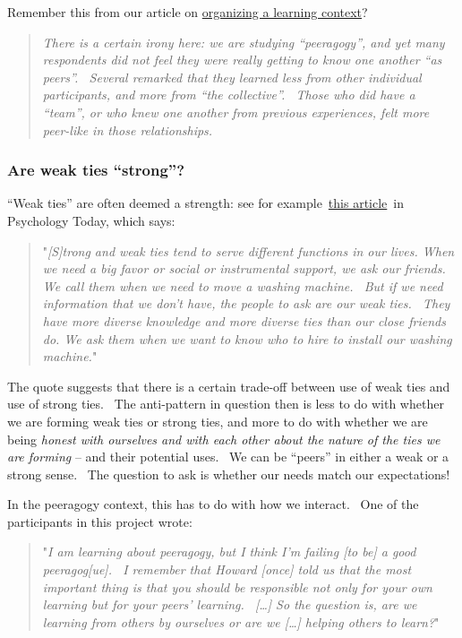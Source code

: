 Remember this from our article on
\href{http://peeragogy.org/organizing-a-learning-context/}{organizing a
learning context}?

\begin{quote}
\emph{There is a certain irony here: we are studying ``peeragogy'', and
yet many respondents did not feel they were really getting to know one
another ``as peers''.~ Several remarked that they learned less from
other individual participants, and more from ``the collective''.~ Those
who did have a ``team'', or who knew one another from previous
experiences, felt more peer-like in those relationships.}
\end{quote}

\subsubsection{Are weak ties ``strong''?}

``Weak ties'' are often deemed a strength: see for
example~\href{http://www.psychologytoday.com/blog/thinking-about-kids/201005/facebook-and-the-strength-weak-ties}{this
article}~in Psychology Today, which says:

\begin{quote}
"\emph{{[}S{]}trong and weak ties tend to serve different functions in
our lives. When we need a big favor or social or instrumental support,
we ask our friends.~ We call them when we need to move a washing
machine.~ But if we need information that we don't have, the people to
ask are our weak ties.~ They have more diverse knowledge and more
diverse ties than our close friends do. We ask them when we want to know
who to hire to install our washing machine.}"
\end{quote}

The quote suggests that there is a certain trade-off between use of weak
ties and use of strong ties.~ The anti-pattern in question then is less
to do with whether we are forming weak ties or strong ties, and more to
do with whether we are being \emph{honest with ourselves and with each
other about the nature of the ties we are forming} -- and their
potential uses.~ We can be ``peers'' in either a weak or a strong
sense.~ The question to ask is whether our needs match our expectations!

In the peeragogy context, this has to do with how we interact.~ One of
the participants in this project wrote:

\begin{quote}
"\emph{I am learning about peeragogy, but I think I'm failing {[}to
be{]} a good peeragog{[}ue{]}.~ I remember that Howard {[}once{]} told
us that the most important thing is that you should be responsible not
only for your own learning but for your peers' learning.~ {[}\ldots{}{]}
So the question is, are we learning from others by ourselves or are we
{[}\ldots{}{]} helping others to learn?}"
\end{quote}


